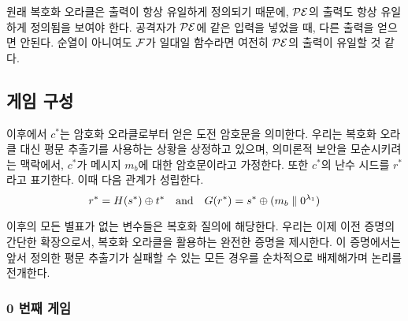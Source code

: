 \begin{memo}
	원래 복호화 오라클은 출력이 항상 유일하게 정의되기 때문에, $\mathcal{PE}$의 출력도
	항상 유일하게 정의됨을 보여야 한다. 공격자가 $\mathcal{PE}$에 같은 입력을 넣었을 때,
	다른 출력을 얻으면 안된다. 순열이 아니여도 $\mathcal{F}$가 일대일 함수라면 여전히
	$\mathcal{PE}$의 출력이 유일할 것 같다.
\end{memo}

\newpage
\subsection{게임 구성}

이후에서 $c^*$는 암호화 오라클로부터 얻은 도전 암호문을 의미한다. 우리는 복호화
오라클 대신 평문 추출기를 사용하는 상황을 상정하고 있으며, 의미론적 보안을
모순시키려는 맥락에서, $c^*$가 메시지 $m_b$에 대한 암호문이라고 가정한다. 또한
$c^*$의 난수 시드를 $r^*$라고 표기한다. 이때 다음 관계가 성립한다.
$$
	r^* = H(s^*) \oplus t^* \quad \text{and} \quad G(r^*) = s^* \oplus (m_b \parallel 0^{\lambda_1})
$$

이후의 모든 별표가 없는 변수들은 복호화 질의에 해당한다. 우리는 이제 이전 증명의
간단한 확장으로서, 복호화 오라클을 활용하는 완전한 증명을 제시한다. 이
증명에서는 앞서 정의한 평문 추출기가 실패할 수 있는 모든 경우를 순차적으로
배제해가며 논리를 전개한다.

\subsubsection{0 번째 게임}

